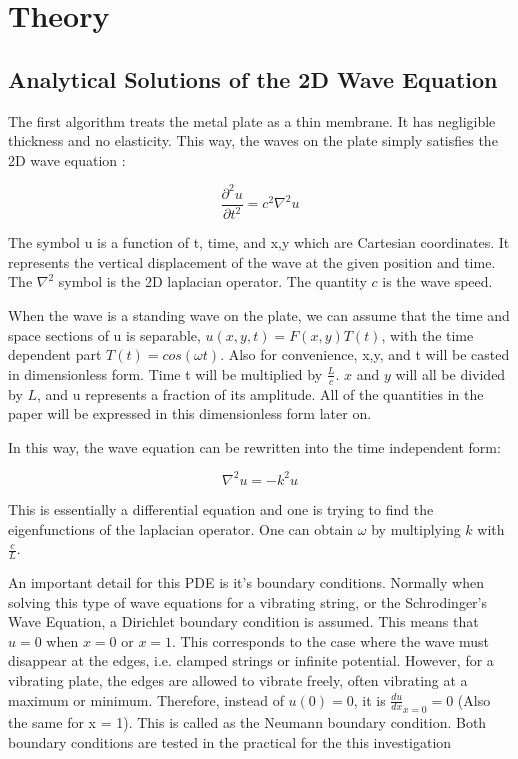 \section{Theory}

\subsection{Analytical Solutions of the 2D Wave Equation}

The first algorithm treats the metal plate as a thin membrane. It has negligible thickness and no elasticity. This way, the waves on the plate simply satisfies the 2D wave equation \autocite{PDE}:

\begin{equation}
   \frac{\partial^2u}{\partial t^2} = c^2 \nabla^2u
\end{equation}

The symbol u is a function of t, time, and x,y which are Cartesian coordinates. It represents the vertical displacement of the wave at the given position and time. The $\nabla^2$ symbol is the 2D laplacian operator. The quantity $c$ is the wave speed.

When the wave is a standing wave on the plate, we can assume that the time and space sections of u is separable, $u(x,y,t) = F(x,y)T(t)$, with the time dependent part $T(t) = cos(\omega t)$. Also for convenience, x,y, and t will be casted in dimensionless form. Time t will be multiplied by $\frac{L}{c}$. $x$ and $y$ will all be divided by $L$, and u represents a fraction of its amplitude. All of the quantities in the paper will be expressed in this dimensionless form later on.

In this way, the wave equation can be rewritten into the time independent form:

\begin{equation}
    \nabla^2 u = -k^2 u
\end{equation}

This is essentially a differential equation and one is trying to find the eigenfunctions of the laplacian operator. One can obtain $\omega$ by multiplying $k$ with $\frac{c}{L}$.

An important detail for this PDE is it's boundary conditions. Normally when solving this type of wave equations for a vibrating string, or the Schrodinger's Wave Equation, a Dirichlet boundary condition is assumed. This means that $u = 0$ when $x = 0$ or $x = 1$. This corresponds to the case where the wave must disappear at the edges, i.e. clamped strings or infinite potential. However, for a vibrating plate, the edges are allowed to vibrate freely, often vibrating at a maximum or minimum. Therefore, instead of $u(0) = 0$, it is $\frac{du}{dx}_{x=0} = 0$ (Also the same for x = 1). This is called as the Neumann boundary condition. Both boundary conditions are tested in the practical for the this investigation

